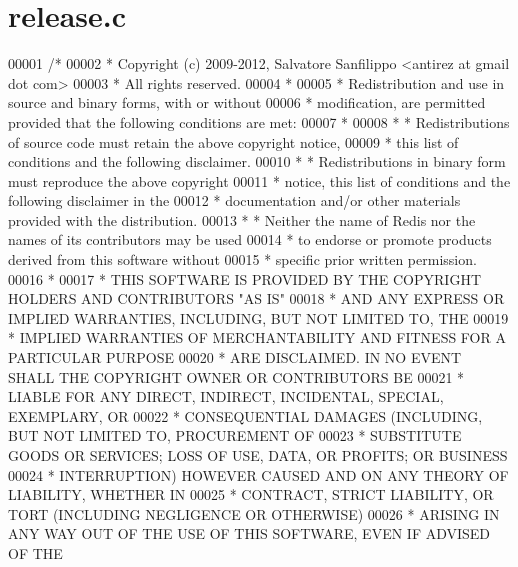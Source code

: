 \hypertarget{release_8c_source}{}\section{release.\+c}
\label{release_8c_source}

\begin{DoxyCode}
00001 \textcolor{comment}{/*}
00002 \textcolor{comment}{ * Copyright (c) 2009-2012, Salvatore Sanfilippo <antirez at gmail dot com>}
00003 \textcolor{comment}{ * All rights reserved.}
00004 \textcolor{comment}{ *}
00005 \textcolor{comment}{ * Redistribution and use in source and binary forms, with or without}
00006 \textcolor{comment}{ * modification, are permitted provided that the following conditions are met:}
00007 \textcolor{comment}{ *}
00008 \textcolor{comment}{ *   * Redistributions of source code must retain the above copyright notice,}
00009 \textcolor{comment}{ *     this list of conditions and the following disclaimer.}
00010 \textcolor{comment}{ *   * Redistributions in binary form must reproduce the above copyright}
00011 \textcolor{comment}{ *     notice, this list of conditions and the following disclaimer in the}
00012 \textcolor{comment}{ *     documentation and/or other materials provided with the distribution.}
00013 \textcolor{comment}{ *   * Neither the name of Redis nor the names of its contributors may be used}
00014 \textcolor{comment}{ *     to endorse or promote products derived from this software without}
00015 \textcolor{comment}{ *     specific prior written permission.}
00016 \textcolor{comment}{ *}
00017 \textcolor{comment}{ * THIS SOFTWARE IS PROVIDED BY THE COPYRIGHT HOLDERS AND CONTRIBUTORS "AS IS"}
00018 \textcolor{comment}{ * AND ANY EXPRESS OR IMPLIED WARRANTIES, INCLUDING, BUT NOT LIMITED TO, THE}
00019 \textcolor{comment}{ * IMPLIED WARRANTIES OF MERCHANTABILITY AND FITNESS FOR A PARTICULAR PURPOSE}
00020 \textcolor{comment}{ * ARE DISCLAIMED. IN NO EVENT SHALL THE COPYRIGHT OWNER OR CONTRIBUTORS BE}
00021 \textcolor{comment}{ * LIABLE FOR ANY DIRECT, INDIRECT, INCIDENTAL, SPECIAL, EXEMPLARY, OR}
00022 \textcolor{comment}{ * CONSEQUENTIAL DAMAGES (INCLUDING, BUT NOT LIMITED TO, PROCUREMENT OF}
00023 \textcolor{comment}{ * SUBSTITUTE GOODS OR SERVICES; LOSS OF USE, DATA, OR PROFITS; OR BUSINESS}
00024 \textcolor{comment}{ * INTERRUPTION) HOWEVER CAUSED AND ON ANY THEORY OF LIABILITY, WHETHER IN}
00025 \textcolor{comment}{ * CONTRACT, STRICT LIABILITY, OR TORT (INCLUDING NEGLIGENCE OR OTHERWISE)}
00026 \textcolor{comment}{ * ARISING IN ANY WAY OUT OF THE USE OF THIS SOFTWARE, EVEN IF ADVISED OF THE}

\end{DoxyCode}
